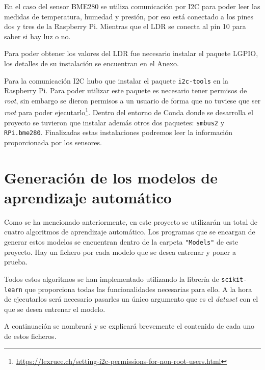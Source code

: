\documentclass[a4paper, 12pt]{book}
\begin{document}
En el caso del sensor BME280 se utiliza comunicación por I2C para poder leer las medidas de temperatura, humedad y presión, por eso está conectado a los pines dos y tres de la Raspberry Pi. Mientras que el LDR se conecta al pin 10 para saber si hay luz o no.

Para poder obtener los valores del LDR fue necesario instalar el paquete LGPIO, los detalles de su instalación se encuentran en el Anexo.

Para la comunicación I2C hubo que instalar el paquete \texttt{i2c-tools} en la Raspberry Pi. Para poder utilizar este paquete es necesario tener permisos de \textit{root}, sin embargo se dieron permisos a un usuario de forma que no tuviese que ser \textit{root} para poder ejecutarlo\footnote{\url{https://lexruee.ch/setting-i2c-permissions-for-non-root-users.html}}. Dentro del entorno de Conda donde se desarrolla el proyecto se tuvieron que instalar además otros dos paquetes: \texttt{smbus2} y \texttt{RPi.bme280}. Finalizadas estas instalaciones podremos leer la información proporcionada por los sensores.

\section{Generación de los modelos de aprendizaje automático}
\label{sec:generacion_modelos}

Como se ha mencionado anteriormente, en este proyecto se utilizarán un total de cuatro algoritmos de aprendizaje automático. Los programas que se encargan de generar estos modelos se encuentran dentro de la carpeta \texttt{"Models"} de este proyecto. Hay un fichero por cada modelo que se desea entrenar y poner a prueba.

Todos estos algoritmos se han implementado utilizando la librería de \texttt{scikit-learn} que proporciona todas las funcionalidades necesarias para ello. A la hora de ejecutarlos será necesario pasarles un único argumento que es el \textit{dataset} con el que se desea entrenar el modelo.

A continuación se nombrará y se explicará brevemente el contenido de cada uno de estos ficheros.
\end{document}
